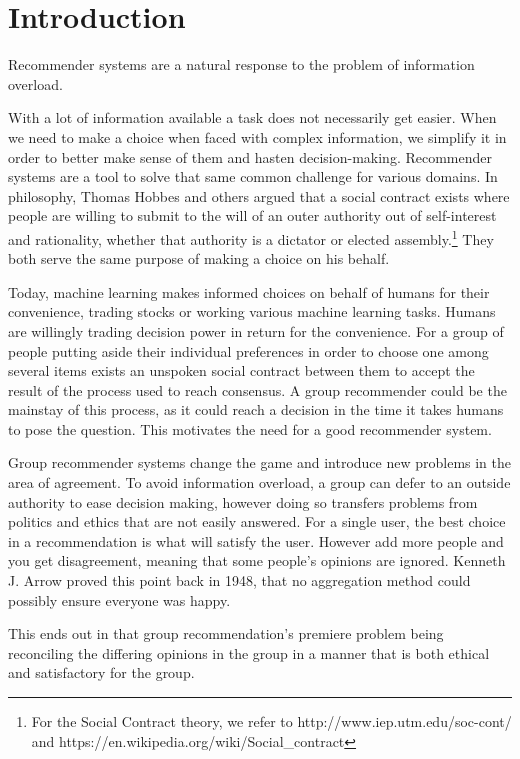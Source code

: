 \chapter{Introduction}
Recommender systems are a natural response to the problem of information overload.

With a lot of information available a task does not necessarily get easier. When we need to make a choice when faced with complex information, we simplify it in order to better make sense of them and hasten decision-making. Recommender systems are a tool to solve that same common challenge for various domains. In philosophy, Thomas Hobbes and others argued that a social contract exists where people are willing to submit to the will of an outer authority out of self-interest and rationality, whether that authority is a dictator or elected assembly.\footnote{For the Social Contract theory, we refer to http://www.iep.utm.edu/soc-cont/ and https://en.wikipedia.org/wiki/Social\_contract} They both serve the same purpose of making a choice on his behalf.

Today, machine learning makes informed choices on behalf of humans for their convenience, trading stocks or working various machine learning tasks. Humans are willingly trading decision power in return for the convenience. For a group of people putting aside their individual preferences in order to choose one among several items exists an unspoken social contract between them to accept the result of the process used to reach consensus. A group recommender could be the mainstay of this process, as it could reach a decision in the time it takes humans to pose the question. This motivates the need for a good recommender system.

Group recommender systems change the game and introduce new problems in the area of agreement. To avoid information overload, a group can defer to an outside authority to ease decision making, however doing so transfers problems from politics and ethics that are not easily answered. For a single user, the best choice in a recommendation is what will satisfy the user. However add more people and you get disagreement, meaning that some people's opinions are ignored. Kenneth J. Arrow proved this point back in 1948, that no aggregation method could possibly ensure everyone was happy.\cite{arrow}

This ends out in that group recommendation's premiere problem being reconciling the differing opinions in the group in a manner that is both ethical and satisfactory for the group.


